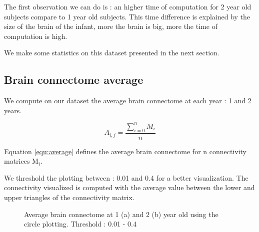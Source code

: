 \documentclass[]{spie}  %
\begin{document}
The first observation we can do is : an higher time of computation for 2 year old subjects compare to 1 year old subjects. This time difference is explained by the size of the brain of the infant, more the brain is big, more the time of computation is high.

We make some statistics on this dataset presented in the next section.

\subsection{Brain connectome average}

We compute on our dataset the average brain connectome at each year : 1 and 2 years. 

\begin{equation}
	A_{i,j} = \frac{\sum_{i=0}^n M_i}{n}
	\label{equ:average}
\end{equation}

Equation \ref{equ:average} defines the average brain connectome for n connectivity matrices M$_{i}$. 

We threshold the plotting between : 0.01 and 0.4 for a better visualization.
The connectivity visualized is computed with the average value between the lower and upper triangles of the connectivity matrix.

\begin{figure}
\centering 
{}
\caption[Average brain connectome at 1 (a) and 2 (b) year old using the circle plotting ]{Average brain connectome at 1 (a) and 2 (b) year old using the circle plotting. Threshold : 0.01 - 0.4}
\label{fig:AverageBrainConnectome}
\end{figure} 
\end{document}
